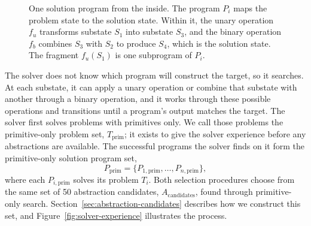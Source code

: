 \documentclass[10pt]{article}
\begin{document}
\begin{figure}[H]
  \centering
  \caption{One solution program from the inside. The program $P_i$ maps the
  problem state to the solution state. Within it, the unary operation $f_u$
  transforms substate $S_1$ into substate $S_3$, and the binary operation
  $f_b$ combines $S_3$ with $S_2$ to produce $S_4$, which is the solution
  state. The fragment $f_u(S_1)$ is one subprogram of $P_i$.}
  \label{fig:program-structure}
\end{figure}

The solver does not know which program will construct the target, so it
searches. At each substate, it can apply a unary operation or combine that
substate with another through a binary operation, and it works through these
possible operations and transitions until a program's output matches the
target. The solver first solves problems with primitives only. We call those
problems the primitive-only problem set, $T_{\mathrm{prim}}$; it
exists to give the solver experience before any abstractions are available.
The successful programs the solver finds on it form the primitive-only
solution program set,
\[
  P_{\mathrm{prim}}
  = \{P_{1,\mathrm{prim}},\ldots,P_{n,\mathrm{prim}}\},
\]
where each $P_{i,\mathrm{prim}}$ solves its problem $T_i$. Both selection procedures choose from the same set of 50 abstraction
candidates, $A_{\mathrm{candidates}}$, found through primitive-only search.
Section~\ref{sec:abstraction-candidates} describes how we construct this set,
and Figure~\ref{fig:solver-experience} illustrates the process.
\end{document}
